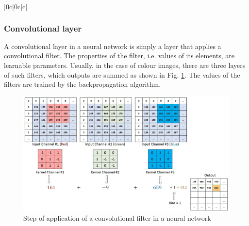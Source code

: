 \begin{table}[h]
\begin{center}
\begin{tabular}{ |0c|0c|c|}
\hline
\end{tabular}
\caption[convo]{Examplary convolutional kernels applied on an image\footnotemark. }
  \label{tab:classical_kernel}
\end{center}
\end{table}




\subsubsection{Convolutional layer}

A convolutional layer in a neural network is simply a layer that applies a convolutional filter. The properties of the filter, i.e. values of its elements, are learnable parameters.
Usually, in the case of colour images, there are three layers of such filters, which outputs are summed as shown in Fig. \ref{fig:conv_layer}.
The values of the filters are trained by the backpropagation algorithm.

\begin{figure}
  \centering
  \includegraphics[width=0.9\linewidth]{figures/chapter3/convo_steps.jpg}
  \caption{Step of application of a convolutional filter in a neural network \protect\footnotemark}
  \label{fig:conv_layer}
\end{figure}


